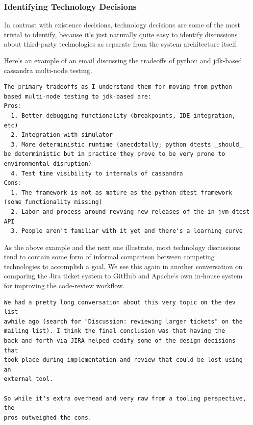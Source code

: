 \documentclass[a4paper, 12pt]{article}
\begin{document}
		\subsubsection{Identifying \textbf{Technology} Decisions}
			In contrast with existence decisions, technology decisions are some of the most trivial to identify, because it's just naturally quite easy to identify discussions about third-party technologies as separate from the system architecture itself.
			
			Here's an example of an email discussing the tradeoffs of python and jdk-based cassandra multi-node testing.
			\begin{verbatim}
The primary tradeoffs as I understand them for moving from python-based multi-node testing to jdk-based are: 
Pros: 
  1. Better debugging functionality (breakpoints, IDE integration, etc) 
  2. Integration with simulator 
  3. More deterministic runtime (anecdotally; python dtests _should_ be deterministic but in practice they prove to be very prone to environmental disruption) 
  4. Test time visibility to internals of cassandra 
Cons:
  1. The framework is not as mature as the python dtest framework (some functionality missing) 
  2. Labor and process around revving new releases of the in-jvm dtest API 
  3. People aren't familiar with it yet and there's a learning curve
			\end{verbatim}
			
			As the above example and the next one illustrate, most technology discussions tend to contain some form of informal comparison between competing technologies to accomplish a goal. We see this again in another conversation on comparing the Jira ticket system to GitHub and Apache's own in-house system for improving the code-review workflow.
			\begin{verbatim}
We had a pretty long conversation about this very topic on the dev list
awhile ago (search for "Discussion: reviewing larger tickets" on the
mailing list). I think the final conclusion was that having the
back-and-forth via JIRA helped codify some of the design decisions that
took place during implementation and review that could be lost using an
external tool.

So while it's extra overhead and very raw from a tooling perspective, the
pros outweighed the cons.
			\end{verbatim}
		
\end{document}
